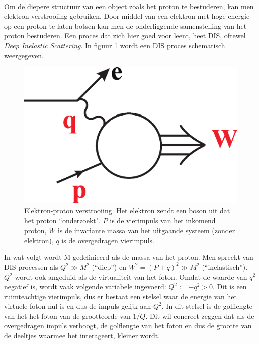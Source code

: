 \documentclass[a4paper,11pt]{article}
\numberwithin{equation}{section} %
\begin{document}
      \paragraph{}
Om de diepere structuur van een object zoals het proton te bestuderen, kan men elektron verstrooiing gebruiken.
Door middel van een elektron met hoge energie op een proton te laten botsen kan men de onderliggende samenstelling van het proton bestuderen.
Een proces dat zich hier goed voor leent, heet DIS, oftewel \textit{Deep Inelastic Scattering}. In figuur \ref{fig:DIS} wordt een DIS proces schematisch weergegeven.
\begin{figure} [H]
  \begin{center}
    \includegraphics[width=.33\textwidth]{Afbeeldingen/DIS.eps}
    \caption{Elektron-proton verstrooiing.
Het elektron zendt een boson uit dat het proton “onderzoekt".
$P$ is de vierimpuls van het inkomend proton, $W$ is de invariante massa van het uitgaande systeem (zonder elektron), $q$ is de overgedragen vierimpuls. \cite{Martin}}
   \label{fig:DIS}
  \end{center}
\end{figure}
 In wat volgt wordt M gedefinieerd als de massa van het proton. Men spreekt van DIS processen als $Q^2 \gg M^2$ (“diep”) en $W^2 = (P+q)^2 \gg M^2$ (“inelastisch”).
$Q^2$ wordt ook angeduid als de virtualiteit van het foton.
Omdat de waarde van $q^2$ negatief is, wordt vaak volgende variabele ingevoerd: $Q^2 :=-q^2 > 0$.  Dit is een ruimteachtige vierimpuls, dus er bestaat een stelsel waar de energie van het virtuele foton nul is en dus de impuls gelijk aan $Q^2$. In dit stelsel is de golflengte van het het foton van de grootteorde van $1/Q$.
Dit wil concreet zeggen dat als de overgedragen impuls verhoogt, de golflengte van het foton en dus de grootte van de deeltjes waarmee het interageert, kleiner wordt.
\end{document}
